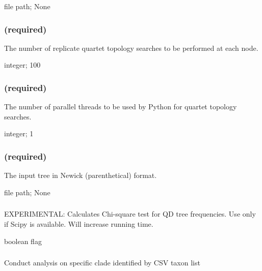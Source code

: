 \documentclass[letterpaper,12pt,english]{sphinxmanual}
\begin{document}
 file path;  None


\subsubsection{ (required)}
\label{\detokenize{prog_desc:reps-number-of-reps-required}}
 The number of replicate quartet topology searches to be performed at each node.

 integer;  100


\subsubsection{ (required)}
\label{\detokenize{prog_desc:threads-number-of-threads-required}}
 The number of parallel threads to be used by Python for quartet topology searches.

 integer;  1


\subsubsection{ (required)}
\label{\detokenize{prog_desc:tree-required}}
 The input tree in Newick (parenthetical) format.

 file path;  None


\subsubsection{}
\label{\detokenize{prog_desc:calc-qdstats}}
 EXPERIMENTAL: Calculates Chi-square test for QD tree frequencies. Use only  if Scipy is available. Will increase running time.

 boolean flag


\subsubsection{}
\label{\detokenize{prog_desc:clade}}
 Conduct analysis on specific clade identified by CSV taxon list
\end{document}
